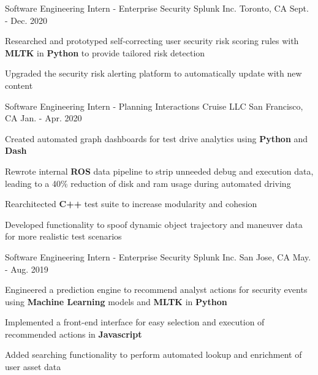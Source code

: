 


\begin{cventries}


\cventry
{Software Engineering Intern - Enterprise Security} %
{Splunk Inc.} %
{Toronto, CA} %
{Sept. - Dec. 2020} %
{ %
\begin{cvitems}
\item {Researched and prototyped self-correcting user security risk scoring rules with {\bf MLTK} in {\bf Python} to provide tailored risk detection}
\item {Upgraded the security risk alerting platform to automatically update with new content}
\end{cvitems}
}

\cventry
{Software Engineering Intern - Planning Interactions} %
{Cruise LLC} %
{San Francisco, CA} %
{Jan. - Apr. 2020} %
{ %
\begin{cvitems}
\item {Created automated graph dashboards for test drive analytics using {\bf Python} and {\bf Dash}}
\item {Rewrote internal {\bf ROS} data pipeline to strip unneeded debug and execution data, leading to a 40\% reduction of disk and ram usage during automated driving}
\item {Rearchitected {\bf C++} test suite to increase modularity and cohesion}
\item {Developed functionality to spoof dynamic object trajectory and maneuver data for more realistic test scenarios}
\end{cvitems}
}


\cventry
{Software Engineering Intern - Enterprise Security} %
{Splunk Inc.} %
{San Jose, CA} %
{May. - Aug. 2019} %
{ %
\begin{cvitems}
\item {Engineered a prediction engine to recommend analyst actions for security events using {\bf Machine Learning} models and {\bf MLTK} in {\bf Python}}
\item {Implemented a front-end interface for easy selection and execution of recommended actions in {\bf Javascript}}
\item {Added searching functionality to perform automated lookup and enrichment of user asset data}
\end{cvitems}
}


\end{cventries}
